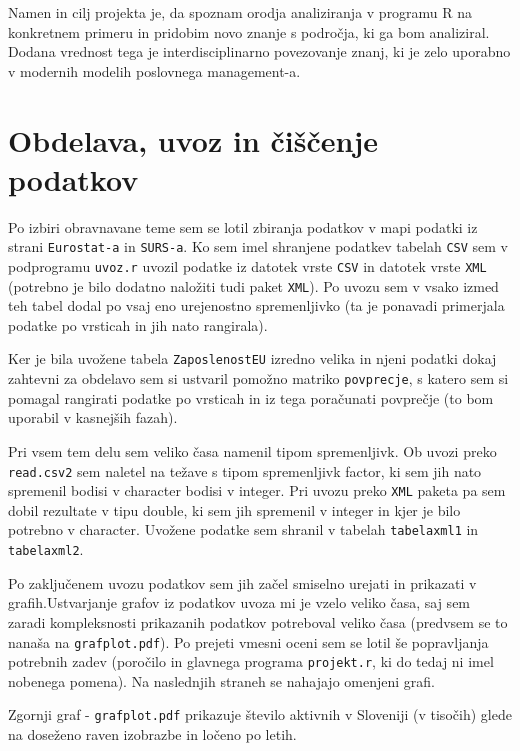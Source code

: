 \documentclass[11pt,a4paper]{article}
\begin{document}
Namen in cilj projekta je, da spoznam orodja analiziranja v programu R na konkretnem primeru in pridobim novo znanje s področja, ki ga bom analiziral. Dodana vrednost tega je interdisciplinarno povezovanje znanj, ki je zelo uporabno v modernih modelih poslovnega management-a. 
\pagebreak
\section{Obdelava, uvoz in čiščenje podatkov}

Po izbiri obravnavane teme sem se lotil zbiranja podatkov v mapi podatki iz strani \verb|Eurostat-a| in \verb|SURS-a|. Ko sem imel shranjene podatkev tabelah \verb|CSV| sem v podprogramu \verb|uvoz.r| uvozil podatke iz datotek vrste \verb|CSV| in datotek vrste \verb|XML| (potrebno je bilo dodatno naložiti tudi paket \verb|XML|). Po uvozu sem v vsako izmed teh tabel dodal po vsaj eno urejenostno spremenljivko (ta je ponavadi primerjala podatke po vrsticah in jih nato rangirala). 

Ker je bila uvožene tabela \verb|ZaposlenostEU| izredno velika in njeni podatki dokaj zahtevni za obdelavo sem si ustvaril pomožno matriko \verb|povprecje|, s katero sem si pomagal rangirati podatke po vrsticah in iz tega poračunati povprečje (to bom uporabil v kasnejših fazah). 

Pri vsem tem delu sem veliko časa namenil tipom spremenljivk. Ob uvozi preko \verb|read.csv2| sem naletel na težave s tipom spremenljivk factor, ki sem jih nato spremenil bodisi v character bodisi v integer. Pri uvozu preko \verb|XML| paketa pa sem dobil rezultate v tipu double, ki sem jih spremenil v integer in kjer je bilo potrebno v character. Uvožene podatke sem shranil v tabelah \verb|tabelaxml1| in \verb|tabelaxml2|. 

Po zaključenem uvozu podatkov sem jih začel smiselno urejati in prikazati v grafih.Ustvarjanje grafov iz podatkov uvoza mi je vzelo veliko časa, saj sem zaradi kompleksnosti prikazanih podatkov potreboval veliko časa (pred\-vsem se to nanaša na \verb|grafplot.pdf|). Po prejeti vmesni oceni sem se lotil še popravljanja potrebnih zadev (poročilo in glavnega programa \verb|projekt.r|, ki do tedaj ni imel nobenega pomena). Na naslednjih straneh se nahajajo omenjeni grafi. 


Zgornji graf - \verb|grafplot.pdf| prikazuje šte\-vilo aktivnih v Sloveniji (v tisočih) glede na doseženo raven izobrazbe in ločeno po letih. 
\end{document}
